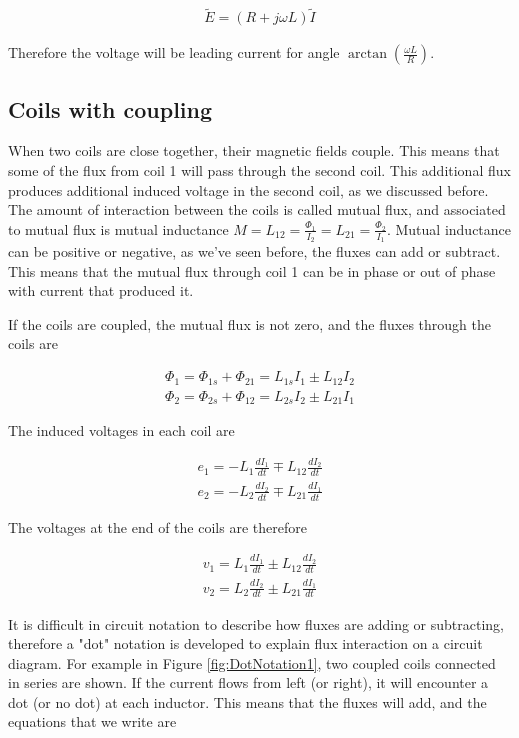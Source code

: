 \documentclass{ximera}
\begin{document}
\begin{eqnarray}
\tilde{E} = (R + j \omega L) \tilde{I}
\end{eqnarray}

Therefore the voltage will be leading current for angle $\arctan(\frac{\omega L}{R})$.

\subsection{Coils with coupling}

When two coils are close together, their magnetic fields couple. This means that some of the flux from coil 1 will pass through the second coil. This additional flux produces additional induced voltage in the second coil, as we discussed before. The amount of interaction between the coils is called mutual flux, and associated to mutual flux is mutual inductance $M=L_{12}=\frac{\Phi_{1}}{I_2}=L_{21}=\frac{\Phi_{2}}{I_1}	$. Mutual inductance can be positive or negative, as we've seen before, the fluxes can add or subtract. This means that the mutual flux through coil 1 can be in phase or out of phase with current that produced it.

If the coils are coupled, the mutual flux is not zero, and the fluxes through the coils are

\begin{eqnarray}
\Phi_1=\Phi_{1s} + \Phi_{21} = L_{1s} I_1 \pm L_{12} I_2 \\
\Phi_2= \Phi_{2s} + \Phi_{12} = L_{2s} I_2 \pm L_{21} I_1 
\end{eqnarray}

The induced voltages in each coil are


\begin{eqnarray}
e_1=  -L_1 \frac{dI_1}{dt} \mp L_{12} \frac{dI_2}{dt} \\
e_2= - L_2 \frac{dI_2}{dt} \mp L_{21} \frac{dI_1}{dt}
\end{eqnarray}

The voltages at the end of the coils are therefore


\begin{eqnarray}
v_1=  L_1 \frac{dI_1}{dt} \pm L_{12} \frac{dI_2}{dt} \\
v_2= L_2 \frac{dI_2}{dt} \pm L_{21} \frac{dI_1}{dt}
\end{eqnarray}


It is difficult in circuit notation to describe how fluxes are adding or subtracting, therefore a "dot" notation is developed to explain flux interaction on a circuit diagram. For example in Figure \ref{fig:DotNotation1}, two coupled coils connected in series are shown. If the current flows from left (or right), it will encounter a dot (or no dot) at each inductor. This means that the fluxes will add, and the equations that we write are
\end{document}
